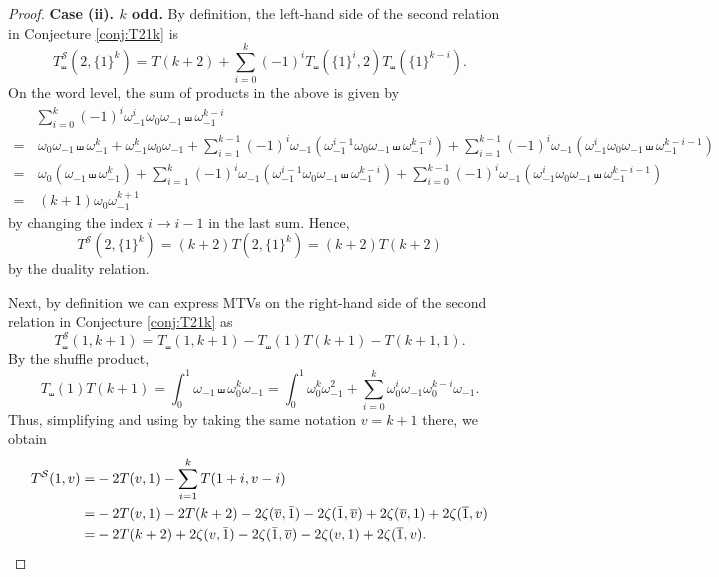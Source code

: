 \documentclass{article}
\newcommand{\sha}{\shuffle}
\newcommand{\Sy}{{\mathcal S}}
\newcommand\om{{\omega}}
\newcommand{\ol}{\overline}
\theoremstyle{plain}
\theoremstyle{definition}
\begin{document}
\begin{proof}
\medskip
\noindent
\textbf{Case (ii). $k$ odd.} By definition, the left-hand side of the second relation in Conjecture \ref{conj:T21k} is
\begin{equation*}
T_\sha^\Sy(2,\{1\}^k)=T(k+2)+\sum_{i=0}^{k}(-1)^i T_\shuffle(\{1\}^i,2)T_\shuffle(\{1\}^{k-i}).
\end{equation*}
On the word level, the sum of products in the above is given by
\begin{align*}
& \sum_{i=0}^{k}(-1)^i  \om_{-1}^i \om_0 \om_{-1} \sha \om_{-1}^{k-i} \\
=&\, \om_0  \om_{-1}  \sha \om_{-1}^{k} +  \om_{-1}^k \om_0 \om_{-1}
+ \sum_{i=1}^{k-1}(-1)^i \om_{-1} (\om_{-1}^{i-1} \om_0 \om_{-1} \sha \om_{-1}^{k-i} )
+  \sum_{i=1}^{k-1}(-1)^i \om_{-1} (\om_{-1}^{i} \om_0 \om_{-1} \sha \om_{-1}^{k-i-1} ) \\
=&\, \om_0  (\om_{-1}  \sha \om_{-1}^{k})
+ \sum_{i=1}^{k}(-1)^i \om_{-1} (\om_{-1}^{i-1} \om_0 \om_{-1} \sha \om_{-1}^{k-i} )
+ \sum_{i=0}^{k-1}(-1)^i \om_{-1} (\om_{-1}^{i} \om_0 \om_{-1} \sha \om_{-1}^{k-i-1} ) \\
=&\, (k+1)\om_0 \om_{-1}^{k+1}
\end{align*}
by changing the index $i\to i-1$ in the last sum. Hence,
\begin{equation}\label{equ:TS21k}
T^{\mathcal S}(2,\{1\}^k)=(k+2) T(2,\{1\}^k) =(k+2) T(k+2)
\end{equation}
by the duality relation.

Next, by definition we can express MTVs on the right-hand side of the second relation in Conjecture \ref{conj:T21k} as
\begin{equation*}
T_\sha^\Sy(1,k+1)=T_\shuffle(1,k+1)-T_\shuffle(1)T(k+1)-T(k+1,1).
\end{equation*}
By the shuffle product,
\begin{equation*}
T_\shuffle(1)T(k+1)=\int_0^1 \om_{-1}\sha \om_0^k \om_{-1} =\int_0^1 \om_0^{k}\om_{-1}^2+\sum_{i=0}^{k}\om_0^i\om_{-1}\om_0^{k-i}\om_{-1}.
\end{equation*}
Thus, simplifying and using \cite[Cor. 4.3]{BCJXXZhao2020c} by taking the same notation $v=k+1$ there, we obtain
\begin{align}
T^{\mathcal S}(1,v)=&-2T(v,1)-\sum_{i=1}^{k}T(1+i,v-i)  \notag\\
=&-2T(v,1)-2T(k+2) - 2\zeta(\ol{v},\bar 1) - 2\zeta(\bar1,\ol{v}) + 2\zeta(\ol{v},1)+2\zeta(\ol{1},v) \notag\\
=&-2T(k+2)+2\zeta(v,\bar 1) - 2\zeta(\bar1,\ol{v})-2\zeta(v,1)+2\zeta(\ol{1},v).\label{equ:T1v}
\end{align}


\end{proof}
\end{document}
